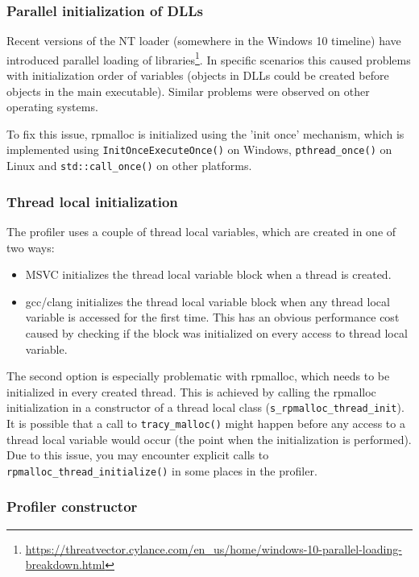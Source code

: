 \documentclass[hidelinks,titlepage,a4paper]{article}
\begin{document}
\subsubsection{Parallel initialization of DLLs}

Recent versions of the NT loader (somewhere in the Windows 10 timeline) have introduced parallel loading of libraries\footnote{\url{https://threatvector.cylance.com/en_us/home/windows-10-parallel-loading-breakdown.html}}. In specific scenarios this caused problems with initialization order of variables (objects in DLLs could be created before objects in the main executable). Similar problems were observed on other operating systems.

To fix this issue, rpmalloc is initialized using the 'init once' mechanism, which is implemented using \texttt{InitOnceExecuteOnce()} on Windows, \texttt{pthread\_once()} on Linux and \texttt{std::call\_once()} on other platforms.

\subsubsection{Thread local initialization}

The profiler uses a couple of thread local variables, which are created in one of two ways:

\begin{itemize}
\item MSVC initializes the thread local variable block when a thread is created.
\item gcc/clang initializes the thread local variable block when any thread local variable is accessed for the first time. This has an obvious performance cost caused by checking if the block was initialized on every access to thread local variable.
\end{itemize}

The second option is especially problematic with rpmalloc, which needs to be initialized in every created thread. This is achieved by calling the rpmalloc initialization in a constructor of a thread local class (\texttt{s\_rpmalloc\_thread\_init}). It is possible that a call to \texttt{tracy\_malloc()} might happen before any access to a thread local variable would occur (the point when the initialization is performed). Due to this issue, you may encounter explicit calls to \texttt{rpmalloc\_thread\_initialize()} in some places in the profiler.

\subsubsection{Profiler constructor}
\end{document}
